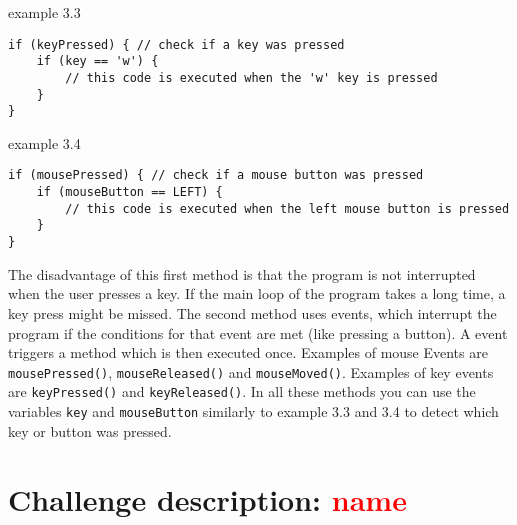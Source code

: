 \begin{codebox}{example 3.3}
    \begin{lstlisting}
if (keyPressed) { // check if a key was pressed
    if (key == 'w') {
        // this code is executed when the 'w' key is pressed
    } 
}
    \end{lstlisting}
\end{codebox}

\newpage

\begin{codebox}{example 3.4}
    \begin{lstlisting}
if (mousePressed) { // check if a mouse button was pressed
    if (mouseButton == LEFT) {
        // this code is executed when the left mouse button is pressed
    } 
}
    \end{lstlisting}
\end{codebox}

The disadvantage of this first method is that the program is not interrupted when the user presses a key. If the main loop of the program takes a long time, a key press might be missed. The second method uses events, which interrupt the program if the conditions for that event are met (like pressing a button). A event triggers a method which is then executed once. Examples of mouse Events are \texttt{mousePressed()}, \texttt{mouseReleased()} and \texttt{mouseMoved()}. Examples of key events are \texttt{keyPressed()} and \texttt{keyReleased()}. In all these methods you can use the variables \texttt{key} and \texttt{mouseButton} similarly to example 3.3 and 3.4 to detect which key or button was pressed.

\section{Challenge description: \textcolor{red}{name}}
